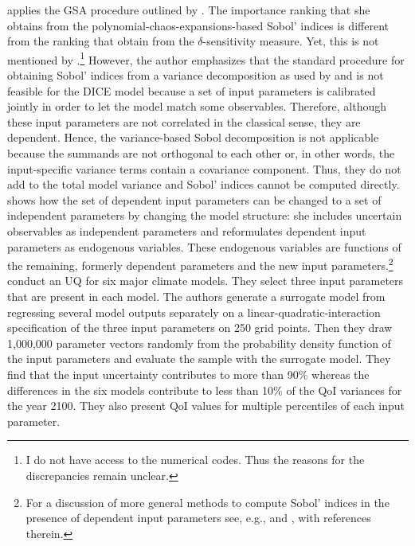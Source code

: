 \cite{Miftakhova.2018} applies the GSA procedure outlined by \cite{Harenberg.2019}. The importance ranking that she obtains from the polynomial-chaos-expansions-based Sobol' indices is different from the ranking that \cite{Anderson.2014} obtain from the $\delta$-sensitivity measure. Yet, this is not mentioned by \citeauthor{Miftakhova.2018}.\footnote{I do not have access to the numerical codes. Thus the reasons for the discrepancies remain unclear.} However, the author emphasizes that the standard procedure for obtaining Sobol' indices from a variance decomposition as used by \cite{Anderson.2014} and \cite{Butler.2014} is not feasible for the DICE model because a set of input parameters is calibrated jointly in order to let the model match some observables. Therefore, although these input parameters are not correlated in the classical sense, they are dependent. Hence, the variance-based Sobol decomposition is not applicable because the summands are not orthogonal to each other or, in other words, the input-specific variance terms contain a covariance component. Thus, they do not add to the total model variance and Sobol' indices cannot be computed directly. \cite{Miftakhova.2018} shows how the set of dependent input parameters can be changed to a set of independent parameters by changing the model structure: she includes uncertain observables as independent parameters and reformulates dependent input parameters as endogenous variables. These endogenous variables are functions of the remaining, formerly dependent parameters and the new input parameters.\footnote{For a discussion of more general methods to compute Sobol' indices in the presence of dependent input parameters see, e.g., \cite{Chastaing.2015} and \cite{Wiederkehr.2018}, with references therein.}\\
\newline
\cite{Gillingham.2015} conduct an UQ for six major climate models. They select three input parameters that are present in each model. The authors generate a surrogate model from regressing several model outputs separately on a linear-quadratic-interaction specification of the three input parameters on 250 grid points. Then they draw 1,000,000 parameter vectors randomly from the probability density function of the input parameters and evaluate the sample with the surrogate model. They find that the input uncertainty contributes to more than 90\% whereas the differences in the six models contribute to less than 10\% of the QoI variances for the year 2100. They also present QoI values for multiple percentiles of each input parameter.\\
